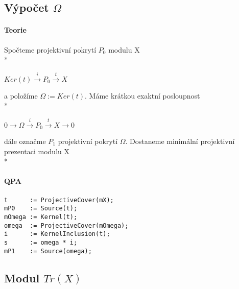 \documentclass[7pt]{article}
\begin{document}
   
    \subsection{Výpočet $\Omega$}
      \paragraph{Teorie} 
        Spočteme projektivní pokrytí $P_0$ modulu X \\* 
        \centerline{$Ker(t)\xrightarrow{i} P_{0}\xrightarrow{t}X$}
        a položíme $\Omega:=Ker(t)$. Máme krátkou exaktní 
        posloupnost \\*
        \centerline{$0\rightarrow\Omega\xrightarrow{i} P_{0}\xrightarrow{t}X\rightarrow0$}
        dále označme $P_1$ projektivní pokrytí $\Omega$. Dostaneme minimální 
        projektivní prezentaci modulu X \\*
        \centerline{  }

      \paragraph{QPA}
\begin{verbatim}
t      := ProjectiveCover(mX);
mP0    := Source(t);
mOmega := Kernel(t);
omega  := ProjectiveCover(mOmega);
i      := KernelInclusion(t);
s      := omega * i;
mP1    := Source(omega);
\end{verbatim}

    \subsection{Modul $Tr(X)$}
\end{document}
